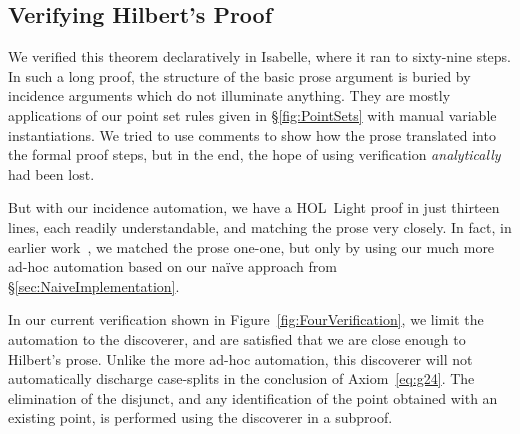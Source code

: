 \subsection{Verifying Hilbert's Proof}
We verified this theorem declaratively in Isabelle, where it ran to sixty-nine steps. In such a long proof, the structure of the basic prose argument is buried by incidence arguments which do not illuminate anything. They are mostly applications of our point set rules given in \S\ref{fig:PointSets} with manual variable instantiations. We tried to use comments to show how the prose translated into the formal proof steps, but in the end, the hope of using verification \emph{analytically} had been lost.

But with our incidence automation, we have a HOL~Light proof in just thirteen lines, each readily understandable, and matching the prose very closely. In fact, in earlier work~\cite{ScottExploring}, we matched the prose one-one, but only by using our much more ad-hoc automation based on our na\"{i}ve approach from \S\ref{sec:NaiveImplementation}.

In our current verification shown in Figure~\ref{fig:FourVerification}, we limit the automation to the  discoverer, and are satisfied that we are close enough to Hilbert's prose. Unlike the more ad-hoc automation, this discoverer will not automatically discharge case-splits in the conclusion of Axiom~\ref{eq:g24}. The elimination of the disjunct, and any identification of the point obtained with an existing point, is performed using the  discoverer in a subproof.

